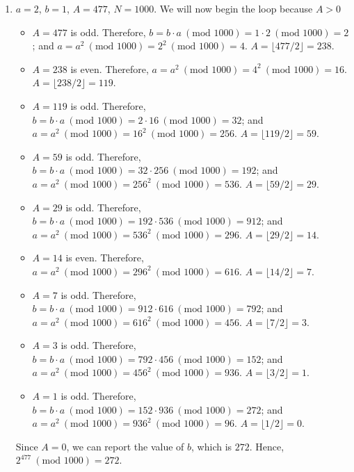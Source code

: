 {\begin{enumerate}
\begin{itemize}
            \item \(A = 1\) is odd. Therefore, \(b = b \cdot a \ (\text{mod } 256) = 113 \cdot 1 \ (\text{mod } 256) = 113\); and \(a = a^2 \ (\text{mod } 256) = 1^2 \ (\text{mod 256}) = 1\). \(A = \lfloor 1 / 2 \rfloor = 0\).
        \end{itemize}
        Since \(A = 0\), we can report the value of \(b\), which is \(113\). Hence, \(17^183 \ (\text{mod }256) = 113\).
        \item \(a = 2\), \(b = 1\), \(A = 477\), \(N = 1000\). We will now begin the loop because \(A > 0\)
        \begin{itemize}
            \item \(A = 477\) is odd. Therefore, \(b = b \cdot a \ (\text{mod } 1000) = 1 \cdot 2 \ (\text{mod } 1000) = 2\); and \(a = a^2 \ (\text{mod } 1000) = 2^2 \ (\text{mod } 1000) = 4\). \(A = \lfloor 477 / 2 \rfloor = 238\).
            \item \(A = 238\) is even. Therefore, \(a = a^2 \ (\text{mod } 1000) = 4^2 \ (\text{mod } 1000) = 16\). \(A = \lfloor 238 / 2 \rfloor = 119\).
            \item \(A = 119\) is odd. Therefore, \(b = b \cdot a \ (\text{mod } 1000) = 2 \cdot 16 \ (\text{mod } 1000) = 32\); and \(a = a^2 \ (\text{mod } 1000) = 16^2 \ (\text{mod } 1000) = 256\). \(A = \lfloor 119 / 2 \rfloor = 59\).
            \item \(A = 59\) is odd. Therefore, \(b = b \cdot a \ (\text{mod } 1000) = 32 \cdot 256 \ (\text{mod } 1000) = 192\); and \(a = a^2 \ (\text{mod } 1000) = 256^2 \ (\text{mod } 1000) = 536\). \(A = \lfloor 59 / 2 \rfloor = 29\).
            \item \(A = 29\) is odd. Therefore, \(b = b \cdot a \ (\text{mod } 1000) = 192 \cdot 536 \ (\text{mod } 1000) = 912\); and \(a = a^2 \ (\text{mod } 1000) = 536^2 \ (\text{mod } 1000) = 296\). \(A = \lfloor 29 / 2 \rfloor = 14\).
            \item \(A = 14\) is even. Therefore, \(a = a^2 \ (\text{mod } 1000) = 296^2 \ (\text{mod } 1000) = 616\). \(A = \lfloor 14 / 2 \rfloor = 7\).
            \item \(A = 7\) is odd. Therefore, \(b = b \cdot a \ (\text{mod } 1000) = 912 \cdot 616 \ (\text{mod } 1000) = 792\); and \(a = a^2 \ (\text{mod } 1000) = 616^2 \ (\text{mod } 1000) = 456\). \(A = \lfloor 7 / 2 \rfloor = 3\).
            \item \(A = 3\) is odd. Therefore, \(b = b \cdot a \ (\text{mod } 1000) = 792 \cdot 456 \ (\text{mod } 1000) = 152\); and \(a = a^2 \ (\text{mod } 1000) = 456^2 \ (\text{mod } 1000) = 936\). \(A = \lfloor 3 / 2 \rfloor = 1\).
            \item \(A = 1\) is odd. Therefore, \(b = b \cdot a \ (\text{mod } 1000) = 152 \cdot 936 \ (\text{mod } 1000) = 272\); and \(a = a^2 \ (\text{mod } 1000) = 936^2 \ (\text{mod } 1000) = 96\). \(A = \lfloor 1 / 2 \rfloor = 0\).
        \end{itemize}
        Since \(A = 0\), we can report the value of \(b\), which is \(272\). Hence, \(2^477 \ (\text{mod }1000) = 272\).
    \end{enumerate}
}

